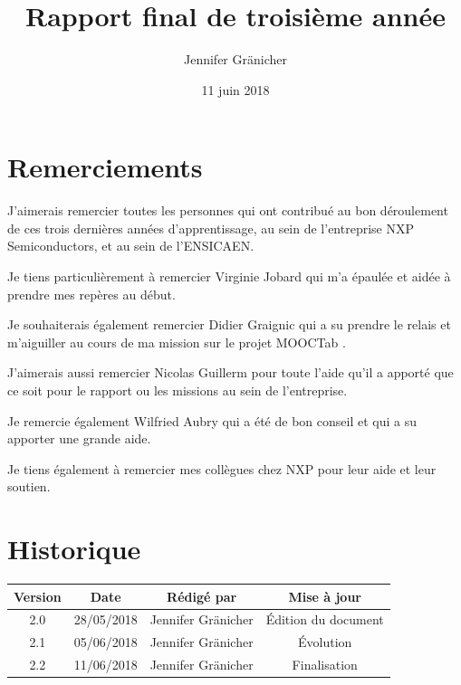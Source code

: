 \documentclass[french,12pt,a4paper,titlepage,openright,openbib]{report}
\title{Rapport final de troisième année}
\author{Jennifer Gr\"{a}nicher}
\date{11 juin 2018}
\begin{document}



\maketitle

\chapter*{Remerciements}
J'aimerais remercier toutes les personnes qui ont contribué au bon déroulement de ces trois dernières années d'apprentissage, au sein de l'entreprise NXP Semiconductors, et au sein de l'ENSICAEN.

Je tiens particulièrement à remercier Virginie Jobard qui m'a épaulée et aidée à prendre mes repères au début.

Je souhaiterais également remercier Didier Graignic qui a su prendre le relais et m'aiguiller au cours de ma mission sur le projet MOOCTab \cite{website:mooctab} \cite{website:mooctabitea}.

J'aimerais aussi remercier Nicolas Guillerm pour toute l'aide qu'il a apporté que ce soit pour le rapport ou les missions au sein de l'entreprise.

Je remercie également Wilfried Aubry qui a été de bon conseil et qui a su apporter une grande aide.

Je tiens également à remercier mes collègues chez NXP pour leur aide et leur soutien.

\tableofcontents

\chapter*{Historique}
\begin{table}[ht]
	\label{tab:historique}
	\centering
	\begin{tabular}{|c|c|c|c|}
		\hline
		{\bf Version} & {\bf Date} & {\bf Rédigé par}    & {\bf Mise à jour}    \\
		\hline
		2.0           & 28/05/2018 & Jennifer Gränicher  & Édition du document \\
		\hline
		2.1           & 05/06/2018 & Jennifer Gränicher  & Évolution \\
		\hline
		2.2           & 11/06/2018 & Jennifer Gränicher  & Finalisation \\
		\hline
	\end{tabular}
\end{table}

\vspace{2cm}
\end{document}
